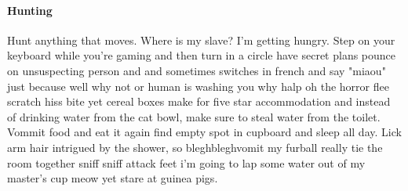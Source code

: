 \documentclass[12pt,a4paper]{article}
\begin{document}
	\paragraph*{Hunting}Hunt anything that moves. Where is my slave? I'm 
	getting hungry. Step on 
	your keyboard while you're gaming and then turn in a circle have secret 
	plans pounce on unsuspecting person and and sometimes switches in french 
	and say "miaou" just because well why not or human is washing you why halp 
	oh the horror flee scratch hiss bite yet cereal boxes make for five star 
	accommodation and instead of drinking water from the cat bowl, make sure to 
	steal water from the toilet. Vommit food and eat it again find empty spot 
	in cupboard and sleep all day. Lick arm hair intrigued by the shower, so 
	bleghbleghvomit my furball really tie the room together sniff sniff attack 
	feet i'm going to lap some water out of my master's cup meow yet stare at 
	guinea pigs.
	
\end{document}
